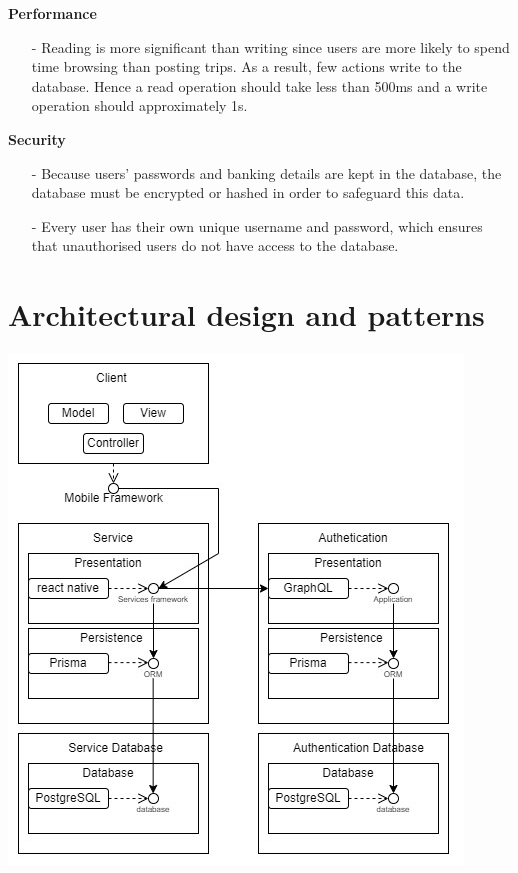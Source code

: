\documentclass[hidelinks, 12pt, a4paper]{article}
\begin{document}
\vspace{0.5cm}
\large{ \textbf{Performance}}
\begin{itemize}
      \item[-] Reading is more significant than writing since users are more likely to spend time browsing than posting trips. As a result, few actions write to the database. Hence a read operation should take less than 500ms and a write operation should approximately 1s.
\end{itemize}
\vspace{0.5cm}
\large{ \textbf{Security}}
\begin{itemize}
      \item [-] Because users' passwords and banking details  are kept in the database, the database must be encrypted or hashed in order to safeguard this data.
      \item [-] Every user has their own unique username and password, which ensures that unauthorised users do not have access to the database.
\end{itemize}
\newpage
\section{Architectural design and patterns}
\begin{center}
    \noindent
    \includegraphics[]{images/Architecture301_1.jpg}
    \vspace{0.5cm}
\end{center}
\end{document}
